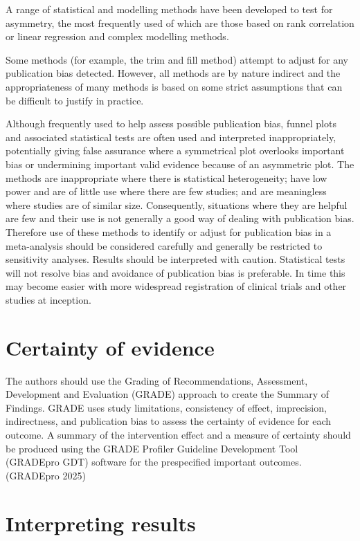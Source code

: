 \documentclass[
  11pt,
  a4paper,
  DIV=11,
  numbers=noendperiod]{scrreprt}
\begin{document}
A range of statistical and modelling methods have been developed to test
for asymmetry, the most frequently used of which are those based on rank
correlation or linear regression and complex modelling methods.

Some methods (for example, the trim and fill method) attempt to adjust
for any publication bias detected. However, all methods are by nature
indirect and the appropriateness of many methods is based on some strict
assumptions that can be difficult to justify in practice.

Although frequently used to help assess possible publication bias,
funnel plots and associated statistical tests are often used and
interpreted inappropriately, potentially giving false assurance where a
symmetrical plot overlooks important bias or undermining important valid
evidence because of an asymmetric plot. The methods are inappropriate
where there is statistical heterogeneity; have low power and are of
little use where there are few studies; and are meaningless where
studies are of similar size. Consequently, situations where they are
helpful are few and their use is not generally a good way of dealing
with publication bias. Therefore use of these methods to identify or
adjust for publication bias in a meta-analysis should be considered
carefully and generally be restricted to sensitivity analyses. Results
should be interpreted with caution. Statistical tests will not resolve
bias and avoidance of publication bias is preferable. In time this may
become easier with more widespread registration of clinical trials and
other studies at inception.

\section{Certainty of evidence}\label{certainty-of-evidence-1}

The authors should use the Grading of Recommendations, Assessment,
Development and Evaluation (GRADE) approach to create the Summary of
Findings. GRADE uses study limitations, consistency of effect,
imprecision, indirectness, and publication bias to assess the certainty
of evidence for each outcome. A summary of the intervention effect and a
measure of certainty should be produced using the GRADE Profiler
Guideline Development Tool (GRADEpro GDT) software for the prespecified
important outcomes. (GRADEpro 2025)

\section{Interpreting results}\label{interpreting-results}
\end{document}
